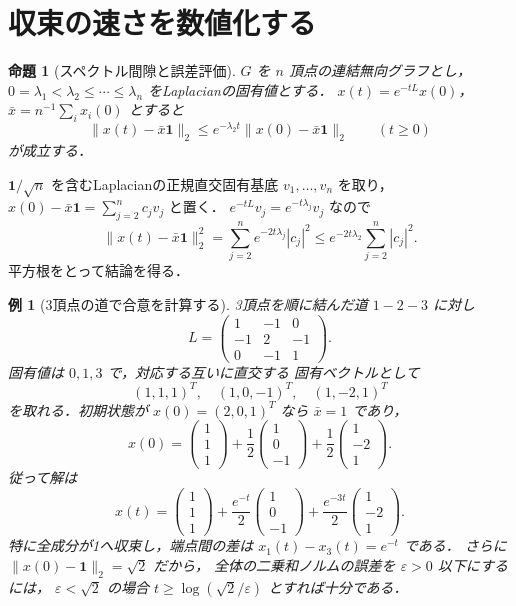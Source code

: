 \documentclass[a5paper,10pt,onecolumn]{jsarticle}
\makeatletter
\theoremstyle{mathnotetheorem}
\newtheorem{proposition}[theorem]{命題}
\newtheorem{example}[theorem]{例}
\renewcommand{\proofname}{証明}
\renewenvironment{proof}[1][\proofname]{%
  \par\pushQED{\qed}\normalfont\topsep4\p@\@plus2\p@\relax
  \trivlist\item[\hskip\labelsep\bfseries #1]\ignorespaces
}{\popQED\endtrivlist\@endpefalse}
\makeatother
\begin{document}
\section{収束の速さを数値化する}
\begin{proposition}[スペクトル間隙と誤差評価]\label{prop:consensus-rate}
$G$ を $n$ 頂点の連結無向グラフとし，
$0=\lambda_1<\lambda_2\le\cdots\le\lambda_n$
をLaplacianの固有値とする．
$x(t)=e^{-tL}x(0)$，$\bar x=n^{-1}\sum_i x_i(0)$ とすると
\[
 \|x(t)-\bar x\mathbf1\|_2
 \le e^{-\lambda_2t}\|x(0)-\bar x\mathbf1\|_2
 \qquad(t\ge0)
\]
が成立する．
\end{proposition}
\begin{proof}
$\mathbf1/\sqrt n$ を含むLaplacianの正規直交固有基底
$v_1,\ldots,v_n$ を取り，
$x(0)-\bar x\mathbf1=\sum_{j=2}^nc_jv_j$ と置く．
$e^{-tL}v_j=e^{-t\lambda_j}v_j$ なので
\[
 \|x(t)-\bar x\mathbf1\|_2^2
 =\sum_{j=2}^n e^{-2t\lambda_j}|c_j|^2
 \le e^{-2t\lambda_2}\sum_{j=2}^n|c_j|^2.
\]
平方根をとって結論を得る．
\end{proof}
\begin{example}[3頂点の道で合意を計算する]\label{ex:path-consensus}
3頂点を順に結んだ道 $1-2-3$ に対し
\[
 L=\begin{pmatrix}1&-1&0\\-1&2&-1\\0&-1&1\end{pmatrix}.
\]
固有値は $0,1,3$ で，対応する互いに直交する
固有ベクトルとして
\[
 (1,1,1)^T,\quad(1,0,-1)^T,\quad(1,-2,1)^T
\]
を取れる．初期状態が $x(0)=(2,0,1)^T$ なら $\bar x=1$ であり，
\[
 x(0)=\begin{pmatrix}1\\1\\1\end{pmatrix}
 +\frac12\begin{pmatrix}1\\0\\-1\end{pmatrix}
 +\frac12\begin{pmatrix}1\\-2\\1\end{pmatrix}.
\]
従って解は
\[
 x(t)=\begin{pmatrix}1\\1\\1\end{pmatrix}
 +\frac{e^{-t}}2\begin{pmatrix}1\\0\\-1\end{pmatrix}
 +\frac{e^{-3t}}2\begin{pmatrix}1\\-2\\1\end{pmatrix}.
\]
特に全成分が1へ収束し，端点間の差は
$x_1(t)-x_3(t)=e^{-t}$ である．
さらに $\|x(0)-\mathbf1\|_2=\sqrt2$ だから，
全体の二乗和ノルムの誤差を $\varepsilon>0$ 以下にするには，
$\varepsilon<\sqrt2$ の場合
$t\ge\log(\sqrt2/\varepsilon)$ とすれば十分である．
\end{example}
\end{document}
